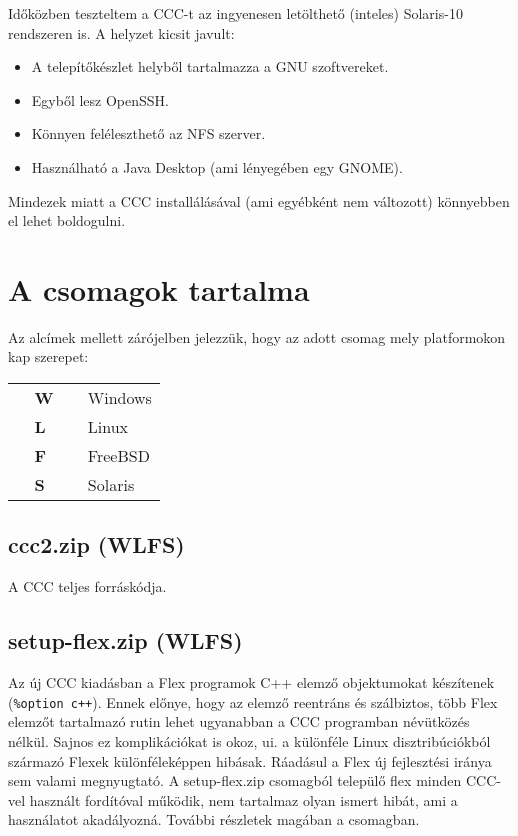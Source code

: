 Időközben teszteltem a CCC-t az ingyenesen letölthető
(inteles) Solaris-10  rendszeren is.  A helyzet kicsit javult:
\begin{itemize}
\item 
    A telepítőkészlet helyből tartalmazza a GNU szoftvereket.
\item 
    Egyből lesz OpenSSH.
\item 
    Könnyen feléleszthető az NFS szerver.
\item 
    Használható a Java Desktop (ami lényegében egy GNOME).
\end{itemize}
Mindezek miatt a CCC installálásával (ami egyébként nem változott) 
könnyebben el lehet boldogulni.


\section{A csomagok tartalma}

Az alcímek mellett zárójelben jelezzük, hogy az adott
csomag mely platformokon kap szerepet:
\begin{tabular}{ll}
\bf ~~W~~   & Windows \\
\bf ~~L~~   & Linux   \\
\bf ~~F~~   & FreeBSD \\
\bf ~~S~~   & Solaris \\
\end{tabular}

\subsection{ccc2.zip (WLFS)}
A CCC teljes forráskódja. 

\subsection{setup-flex.zip (WLFS)}

Az új CCC kiadásban a Flex programok C++ elemző objektumokat
készítenek (\verb!%option c++!). Ennek előnye, hogy az elemző reentráns
és szálbiztos, több Flex elemzőt tartalmazó rutin lehet ugyanabban
a CCC programban névütközés nélkül. 
Sajnos ez komplikációkat is okoz, ui. a különféle Linux 
disztribúciókból származó Flexek különféleképpen hibásak.
Ráadásul a Flex új fejlesztési iránya sem valami megnyugtató.
A setup-flex.zip csomagból települő flex
minden CCC-vel használt fordítóval működik, 
nem tartalmaz olyan ismert hibát, ami a használatot akadályozná.
További részletek magában a csomagban.


